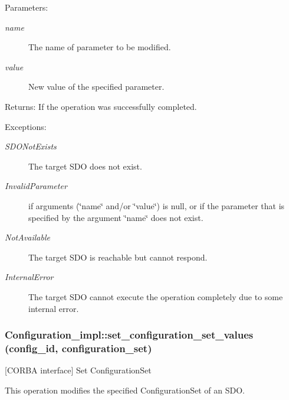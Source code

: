 \begin{Desc}
\item[Parameters:]
\begin{description}
\item[{\em name}]The name of parameter to be modified. \item[{\em value}]New value of the specified parameter. \end{description}
\end{Desc}
\begin{Desc}
\item[Returns:]If the operation was successfully completed. \end{Desc}
\begin{Desc}
\item[Exceptions:]
\begin{description}
\item[{\em SDONot\-Exists}]The target SDO does not exist. \item[{\em Invalid\-Parameter}]if arguments (\char`\"{}name\char`\"{} and/or \char`\"{}value\char`\"{}) is null, or if the parameter that is specified by the argument \char`\"{}name\char`\"{} does not exist. \item[{\em Not\-Available}]The target SDO is reachable but cannot respond. \item[{\em Internal\-Error}]The target SDO cannot execute the operation completely due to some internal error.\end{description}
\end{Desc}
\subsubsection{\setlength{\rightskip}{0pt plus 5cm}Configuration\_\-impl::set\_\-configuration\_\-set\_\-values ({\bf config\_\-id}, configuration\_\-set)}\label{classConfiguration__impl_Configuration__impla12}


[CORBA interface] Set Configuration\-Set 

This operation modifies the specified Configuration\-Set of an SDO.


